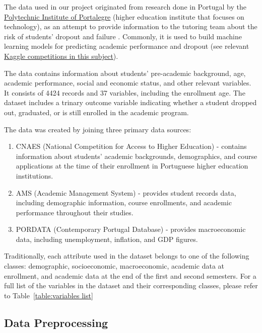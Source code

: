 \documentclass[11pt]{article}
\begin{document}
The data used in our project originated from research done in Portugal by the \href{https://www.ipportalegre.pt/pt/}{Polytechnic Institute of Portalegre} (higher education institute that focuses on technology), as an attempt to provide information to the tutoring team about the risk of students' dropout and failure \citep{data7110146}. Commonly, it is used to build machine learning models for predicting academic performance and dropout (see relevant \href{https://www.kaggle.com/datasets/ankanhore545/dropout-or-academic-success/data}{Kaggle competitions in this subject}).

The data contains information about students' pre-academic background, age, academic performance, social and economic status, and other relevant variables. It consists of 4424 records and 37 variables, including the enrollment age. The dataset includes a trinary outcome variable indicating whether a student dropped out, graduated, or is still enrolled in the academic program. 

The data was created by joining three primary data sources: 
\begin{enumerate}
    \item CNAES (National Competition for Access to Higher Education) - contains information about students' academic backgrounds, demographics, and course applications at the time of their enrollment in Portuguese higher education institutions.
    \item AMS (Academic Management System) - provides student records data, including demographic information, course enrollments, and academic performance throughout their studies.
    \item PORDATA (Contemporary Portugal Database) - provides macroeconomic data, including unemployment, inflation, and GDP figures.
\end{enumerate}

Traditionally, each attribute used in the dataset belongs to one of the following classes: demographic,
socioeconomic, macroeconomic, academic data at enrollment, and academic data at the end of the first and second semesters. For a full list of the variables in the dataset and their corresponding classes, please refer to Table~\ref{table:variables list}

\subsection{Data Preprocessing}
\end{document}
